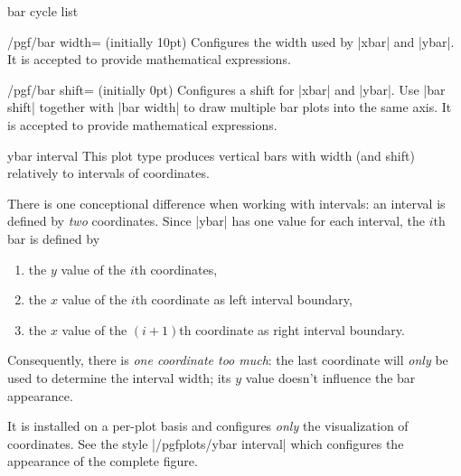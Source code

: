 {\begin{pgfplotskey}{bar cycle list}
\end{pgfplotskey}

\begin{key}{/pgf/bar width= (initially 10pt)}
	Configures the width used by |xbar| and |ybar|. It is accepted to provide mathematical expressions.
\end{key}

\begin{key}{/pgf/bar shift= (initially 0pt)}
	Configures a shift for |xbar| and |ybar|. Use |bar shift| together with |bar width| to draw multiple bar plots into the same axis. It is accepted to provide mathematical expressions.
\end{key}


\begin{plottype}{ybar interval}
	This plot type produces vertical bars with width (and shift) relatively to intervals of coordinates.

	There is one conceptional difference when working with intervals: an interval is defined by \emph{two} coordinates. Since |ybar| has one value for each interval, the $i$th bar is defined by
	\begin{enumerate}
		\item the $y$ value of the $i$th coordinates,
		\item the $x$ value of the $i$th coordinate as left interval boundary,
		\item the $x$ value of the $(i+1)$th coordinate as right interval boundary.
	\end{enumerate}
	Consequently, there is \emph{one coordinate too much}: the last coordinate will \emph{only} be used to determine the interval width; its $y$ value doesn't influence the bar appearance.

	It is installed on a per-plot basis and configures \emph{only} the visualization of coordinates. See the style |/pgfplots/ybar interval| which configures the appearance of the complete figure.
\begin{codeexample}[]
\end{codeexample}

\begin{codeexample}[]
\end{codeexample}


\end{plottype}}
